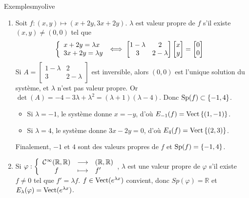     \begin{omed}{Exemples}{myolive}
        \begin{enumerate}[label=\arabic*.]
            \item Soit $f : (x,y) \mapsto (x + 2y, 3x + 2y)$. $\lambda$ est valeur propre de $f$ s’il existe $(x,y) \neq (0,0)$ tel que
            \begin{align*}
                \et{x + 2y = \lambda x}{3x + 2y = \lambda y}
                &\iff \begin{bmatrix}
                    1- \lambda & 2 \\
                    3 & 2 - \lambda
                \end{bmatrix} \begin{bmatrix}
                    x \\
                    y
                \end{bmatrix} = \begin{bmatrix}
                    0 \\
                    0
                \end{bmatrix} 
            \end{align*}
            Si $A = \begin{bmatrix}
                1- \lambda & 2 \\
                3 & 2 - \lambda
            \end{bmatrix}$ est inversible, alors $(0,0)$ est l’unique solution du système, et $\lambda$ n’est pas valeur propre. Or $\det(A) = -4 -3\lambda + \lambda^2 = (\lambda + 1)(\lambda - 4)$. Donc $\operatorname{Sp}(f) \subset \left\{-1, 4\right\}$.
            \begin{itemize}
                \item Si $\lambda = -1$, le système donne $x = -y$, d’où $E_{-1}(f) = \operatorname{Vect}\left\{(1,-1)\right\}$.
                \item Si $\lambda = 4$, le système donne $3x - 2y = 0$, d’où $E_{4}(f) = \operatorname{Vect}\left\{(2,3)\right\}$.
            \end{itemize}
            Finalement, $-1$ et $4$ sont des valeurs propres de $f$ et $\operatorname{Sp}(f) = \left\{-1,4\right\}$.
            \item Si $\fonction{\varphi}{\mathcal{C}^{\infty}(\mathbb{R},\mathbb{R})}{(\mathbb{R},\mathbb{R})}{f}{f'}$, $\lambda$ est une valeur propre de $\varphi$ s’il existe $f \neq 0$ tel que $f' = \lambda f$. $f \in \operatorname{Vect}(e^{\lambda x})$ convient, donc $Sp(\varphi) = \mathbb{R}$ et $E_{\lambda}(\varphi) = \operatorname{Vect}(e^{\lambda x})$.
        \end{enumerate}
    \end{omed}

